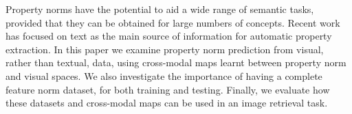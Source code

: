 Property norms have the potential to aid a wide range of semantic tasks, provided that they can be obtained for large numbers of concepts. Recent work has focused on text as the main source of information for automatic property extraction. In this paper we examine property norm prediction from visual, rather than textual, data, using cross-modal maps learnt between property norm and visual spaces. We also investigate the importance of having a complete feature norm dataset, for both training and testing. Finally, we evaluate how these datasets and cross-modal maps can be used in an image retrieval task.
